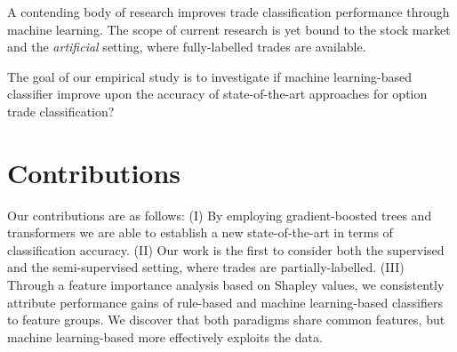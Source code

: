 A contending body of research \autocites{blazejewskiLocalNonParametricModel2005}{rosenthalModelingTradeDirection2012}{ronenMachineLearningTrade2022} improves trade classification performance through machine learning. The scope of current research is yet bound to the stock market and the \textit{artificial} setting, where fully-labelled trades are available. 

The goal of our empirical study is to investigate if  machine learning-based classifier improve upon the accuracy of state-of-the-art approaches for option trade classification?

\section{Contributions}

Our contributions are as follows: (I) By employing gradient-boosted trees and transformers we are able to establish a new state-of-the-art in terms of classification accuracy. (II) Our work is the first to consider both the supervised and the semi-supervised setting, where trades are partially-labelled. (III) Through a feature importance analysis based on Shapley values, we consistently attribute performance gains of rule-based and machine learning-based classifiers to feature groups. We discover that both paradigms share common features, but machine learning-based more effectively exploits the data. %











